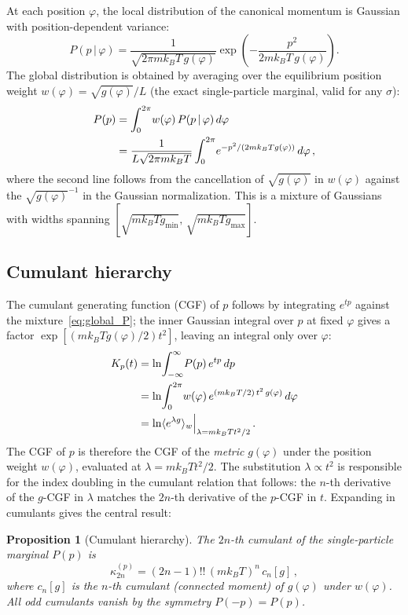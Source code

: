 \documentclass[aps,pre,twocolumn,superscriptaddress,longbibliography,floatfix]{revtex4-2}
\newtheorem{proposition}{Proposition}
\begin{document}
At each position $\varphi$, the local distribution of the canonical momentum is Gaussian with
position-dependent variance:
\begin{equation}
  P(p\,|\,\varphi) = \frac{1}{\sqrt{2\pi mk_BT\,g(\varphi)}}
  \exp\!\left(-\frac{p^2}{2mk_BT\,g(\varphi)}\right).
  \label{eq:local_P}
\end{equation}
The global distribution is obtained by averaging over the equilibrium position weight
$w(\varphi)=\sqrt{g(\varphi)}/L$ (the exact single-particle marginal, valid for any $\sigma$):
\begin{align}
  P(p) &= \int_0^{2\pi}\! w(\varphi)\,P(p\,|\,\varphi)\,d\varphi \notag\\
       &= \frac{1}{L\sqrt{2\pi mk_BT}}\int_0^{2\pi}\!
          e^{-p^2/(2mk_BTg(\varphi))}\,d\varphi\,,
  \label{eq:global_P}
\end{align}
where the second line follows from the cancellation of $\sqrt{g(\varphi)}$ in
$w(\varphi)$ against the $\sqrt{g(\varphi)}^{-1}$ in the Gaussian normalization.
This is a mixture of Gaussians with widths spanning
$[\sqrt{mk_BTg_{\min}},\,\sqrt{mk_BTg_{\max}}]$.

\subsection{Cumulant hierarchy}

The cumulant generating function (CGF) of $p$ follows by integrating $e^{tp}$ against the
mixture~\eqref{eq:global_P}; the inner Gaussian integral over $p$ at fixed $\varphi$ gives
a factor $\exp[(mk_BTg(\varphi)/2)t^2]$, leaving an integral only over $\varphi$:
\begin{align}
  K_p(t) &= \ln\!\int_{-\infty}^{\infty}\!P(p)\,e^{tp}\,dp \notag\\
         &= \ln\!\int_0^{2\pi}\!w(\varphi)\,e^{(mk_BT/2)\,t^2\,g(\varphi)}\,d\varphi \notag\\
         &= \ln\langle e^{\lambda g}\rangle_w\Big|_{\lambda=mk_BT t^2/2}\,.
  \label{eq:CGF}
\end{align}
The CGF of $p$ is therefore the CGF of the \emph{metric} $g(\varphi)$ under the position
weight $w(\varphi)$, evaluated at $\lambda=mk_BT t^2/2$.
The substitution $\lambda\propto t^2$ is responsible for the index doubling
in the cumulant relation that follows: the $n$-th derivative of the $g$-CGF in $\lambda$
matches the $2n$-th derivative of the $p$-CGF in $t$.
Expanding in cumulants gives the central result:

\begin{proposition}[Cumulant hierarchy]
\label{prop:cumulants}
The $2n$-th cumulant of the single-particle marginal $P(p)$ is
\begin{equation}
  \kappa_{2n}^{(p)} = (2n-1)!!\,(mk_BT)^n\,c_n[g]\,,
  \label{eq:cumulant_hierarchy}
\end{equation}
where $c_n[g]$ is the $n$-th cumulant (connected moment) of $g(\varphi)$ under $w(\varphi)$.
All odd cumulants vanish by the symmetry $P(-p)=P(p)$.
\end{proposition}
\end{document}
